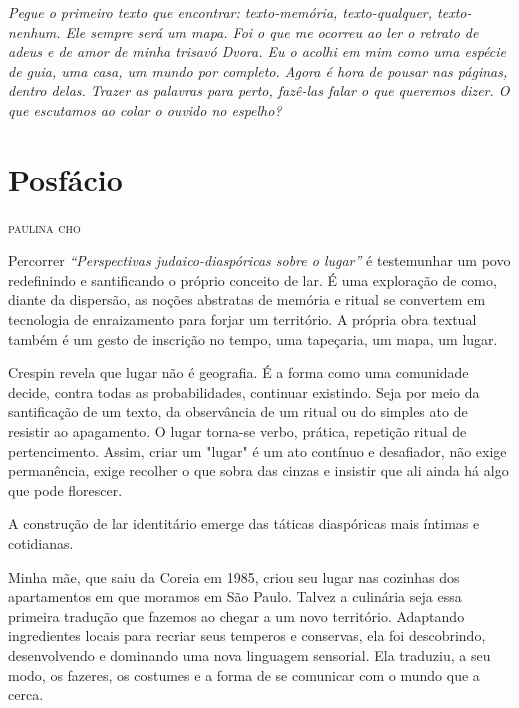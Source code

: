 {
\mbox{}
\thispagestyle{empty}

\vfill

\footnotesize
\noindent{}\emph{Pegue o primeiro texto que encontrar: \emph{texto-memória},
\emph{texto-qualquer}, \emph{texto-nenhum}. Ele sempre será um mapa. Foi
o que me ocorreu ao ler o retrato de adeus e de amor de minha trisavó
Dvora. %
  Eu o acolhi em mim como uma espécie de guia, uma casa, um
mundo por completo. Agora é hora de pousar nas páginas, dentro delas. Trazer as palavras para perto, fazê-las falar o que queremos dizer. O que escutamos ao colar o ouvido no espelho?}

\pagebreak
}

\chapter*{Posfácio\smallskip{}}

\begin{flushright}
\textsc{paulina cho}
\end{flushright}

\noindent{}Percorrer \emph{``Perspectivas judaico-diaspóricas sobre o lugar''} é
testemunhar um povo redefinindo e santificando o próprio conceito de
lar. É uma exploração de como, diante da dispersão, as noções abstratas
de memória e ritual se convertem em tecnologia de enraizamento para
forjar um território. A própria obra textual também é um gesto de
inscrição no tempo, uma tapeçaria, um mapa, um lugar.

Crespin revela que lugar não é geografia. É a forma como uma comunidade
decide, contra todas as probabilidades, continuar existindo. Seja por
meio da santificação de um texto, da observância de um ritual ou do
simples ato de resistir ao apagamento. O lugar torna-se verbo, prática,
repetição ritual de pertencimento. Assim, criar um "lugar" é um ato
contínuo e desafiador, não exige permanência, exige recolher o que sobra
das cinzas e insistir que ali ainda há algo que pode florescer.

A construção de lar identitário emerge das táticas diaspóricas mais
íntimas e cotidianas.

Minha mãe, que saiu da Coreia em 1985, criou seu lugar nas cozinhas dos
apartamentos em que moramos em São Paulo. Talvez a culinária seja essa
primeira tradução que fazemos ao chegar a um novo território. Adaptando
ingredientes locais para recriar seus temperos e conservas, ela foi
descobrindo, desenvolvendo e dominando uma nova linguagem sensorial. Ela
traduziu, a seu modo, os fazeres, os costumes e a forma de se comunicar
com o mundo que a cerca.

